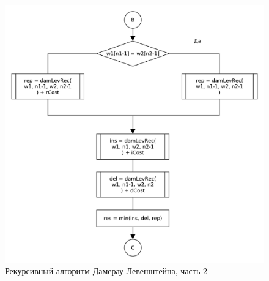 \begin{figure}[H]
    \centering
    \includegraphics[scale=0.75]{pdf/damerau-levenshteainrec-part2.pdf}
    \caption{Рекурсивный алгоритм Дамерау-Левенштейна, часть 2}
\end{figure}
